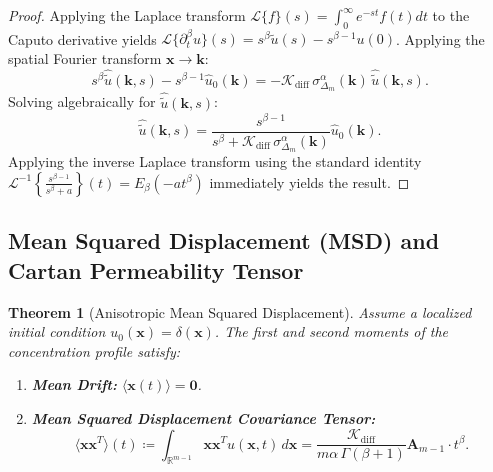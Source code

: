 \documentclass[11pt,a4paper]{article}
\theoremstyle{plain}
\newtheorem{theorem}{Theorem}[section]
\theoremstyle{definition}
\theoremstyle{remark}
\numberwithin{equation}{section}
\begin{document}
\begin{proof}
Applying the Laplace transform $\mathcal{L}\{f\}(s) = \int_0^\infty e^{-st}f(t)dt$ to the Caputo derivative yields $\mathcal{L}\{\partial_t^\beta u\}(s) = s^\beta \widetilde{u}(s) - s^{\beta-1}u(0)$. Applying the spatial Fourier transform $\mathbf{x} \to \mathbf{k}$:
\begin{equation}
s^\beta \widehat{\widetilde{u}}(\mathbf{k}, s) - s^{\beta-1}\widehat{u}_0(\mathbf{k}) = -\mathcal{K}_{\text{diff}}\,\sigma_{\Delta_m}^\alpha(\mathbf{k})\,\widehat{\widetilde{u}}(\mathbf{k}, s).
\end{equation}
Solving algebraically for $\widehat{\widetilde{u}}(\mathbf{k}, s)$:
\begin{equation}
\widehat{\widetilde{u}}(\mathbf{k}, s) = \frac{s^{\beta-1}}{s^\beta + \mathcal{K}_{\text{diff}}\,\sigma_{\Delta_m}^\alpha(\mathbf{k})} \widehat{u}_0(\mathbf{k}).
\end{equation}
Applying the inverse Laplace transform using the standard identity $\mathcal{L}^{-1}\left\{\frac{s^{\beta-1}}{s^\beta + a}\right\}(t) = E_\beta(-a t^\beta)$ immediately yields the result.
\end{proof}

\subsection{Mean Squared Displacement (MSD) and Cartan Permeability Tensor}

\begin{theorem}[Anisotropic Mean Squared Displacement]
\label{thm:msd}
Assume a localized initial condition $u_0(\mathbf{x}) = \delta(\mathbf{x})$. The first and second moments of the concentration profile satisfy:
\begin{enumerate}
    \item \textbf{Mean Drift:} $\langle \mathbf{x}(t) \rangle = \mathbf{0}$.
    \item \textbf{Mean Squared Displacement Covariance Tensor:}
    \begin{equation}
    \langle \mathbf{x} \mathbf{x}^T \rangle(t) \coloneqq \int_{\mathbb{R}^{m-1}} \mathbf{x}\mathbf{x}^T u(\mathbf{x}, t)\,d\mathbf{x} = \frac{\mathcal{K}_{\text{diff}}}{m \alpha \, \Gamma(\beta + 1)} \mathbf{A}_{m-1} \cdot t^\beta.
    \end{equation}
\end{enumerate}
\end{theorem}
\end{document}
